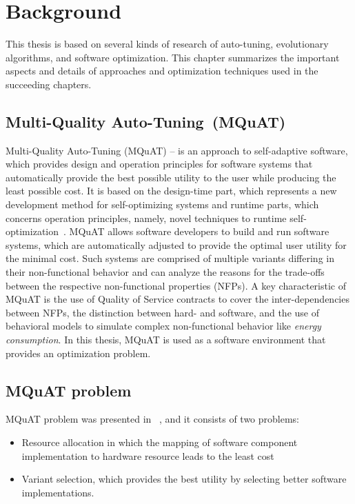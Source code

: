 \chapter{Background}
This thesis is based on several kinds of research of auto-tuning, evolutionary algorithms, and software optimization. This chapter summarizes the important aspects and details of approaches and optimization techniques used in the succeeding chapters.  

\section{Multi-Quality Auto-Tuning~(MQuAT)}

Multi-Quality Auto-Tuning (MQuAT) – is an approach to self-adaptive software, which provides design and operation principles for software systems that automatically provide the best possible utility to the user while producing the least possible cost.
It is based on the design-time part, which represents a new development method for self-optimizing systems and runtime parts, which concerns operation principles, namely,  novel techniques to runtime self-optimization~\cite{gotz13}.
MQuAT allows software developers to build and run software systems, which are automatically adjusted to provide the optimal user utility for the minimal cost. Such systems are comprised of multiple variants differing in their non-functional behavior and can analyze the reasons for the trade-offs between the respective non-functional properties (NFPs).  A key characteristic of MQuAT is the use of Quality of Service contracts to cover the inter-dependencies between NFPs,  the distinction between hard- and software, and the use of behavioral models to simulate complex non-functional behavior like \textit{energy consumption}.
In this thesis, MQuAT is used as a software environment that provides an optimization problem.


\section{MQuAT problem}

MQuAT problem was presented in ~\cite{gotz18}, and it consists of two problems:

\begin{itemize}
	\item Resource allocation in which the mapping of software component implementation to hardware resource leads to the least cost
	\item Variant selection, which provides the best utility by selecting better software implementations.
\end{itemize} 

